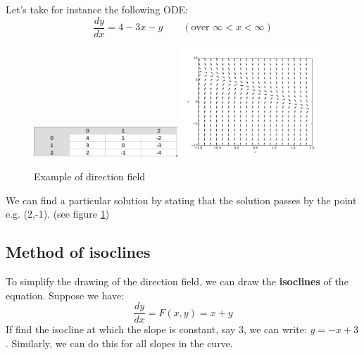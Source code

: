 \begin{exmp}
Let's take for instance the following ODE:
\begin{equation}
\frac{dy}{dx}=4-3x -y \qquad (\text{over }\infty<x<\infty)
\end{equation}
\begin{figure}
\centering
\includegraphics[width=0.48\textwidth]{figs/DirectionalField.pdf} 
\includegraphics[width=0.49\textwidth]{figs/DirectionField.pdf} 
\caption{Example of direction field \label{exDirField}}
\end{figure}
We can find a particular solution by stating that the solution passes by the point e.g. (2,-1). (see figure \ref{exDirField})
\end{exmp}

\subsection{Method of isoclines}
To simplify the drawing of the direction field, we can draw the \textbf{isoclines} of the equation. 
Suppose we have:
\begin{equation}
\frac{dy}{dx} = F(x,y)= x+y
\end{equation}
If find the isocline at which the slope is constant, say 3, we can write: $y=-x + 3$. Similarly, we can do this for all slopes in the curve.



